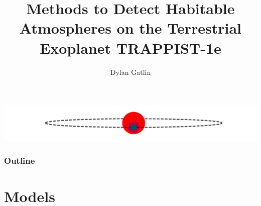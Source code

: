 \documentclass{beamer}
\title{Methods to Detect Habitable Atmospheres on the Terrestrial Exoplanet
       TRAPPIST-1e}
\author{Dylan Gatlin}
\date{\displaydate{defense}}
\begin{document}


\begin{frame}
    \includegraphics[width=\textwidth]{transit.png}
    \titlepage
\end{frame}

\begin{frame}
    \frametitle{Outline}
    \tableofcontents
\end{frame}

\section{Models}
\end{document}
